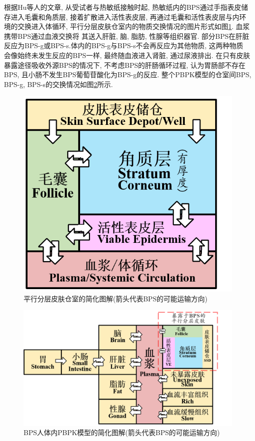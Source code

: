 \documentclass[a4paper,punct=banjiao,twoside]{ctexrep}
\theoremstyle{plain}
\theoremstyle{definition}
\theoremstyle{remark}
\begin{document}
根据Hu等人的文章\cite{11}, 从受试者与热敏纸接触时起, 热敏纸内的BPS通过手指表皮储存进入毛囊和角质层, 接着扩散进入活性表皮层, 再通过毛囊和活性表皮层与内环境的交换进入体循环, 平行分层皮肤仓室内的物质交换情况的图片形式如图\ref{分层皮肤}. 血浆携带BPS通过血液交换将
其送入肝脏, 脑, 脂肪, 性腺等组织器官. 部分BPS在肝脏反应为BPS-g或BPS-s.体内的BPS-g与BPS-s不会再反应为其他物质, 这两种物质
会像始终未发生反应的BPS一样, 最终随血液进入肾脏, 通过尿液排出. 在只有皮肤暴露途径吸收外源BPS的情况下, 不考虑BPS的肝肠循环过程, 认为胃肠部不存在BPS, 且小肠不发生BPS葡萄苷酸化为BPS-g的反应. 
整个PBPK模型的仓室间BPS, BPS-g, BPS-s的交换情况如图\ref{模型图解}所示.
\begin{figure}[H]
  \centering
  \includegraphics[scale=0.6]{./figs/p1.png}
  \caption{平行分层皮肤仓室的简化图解(箭头代表BPS的可能运输方向)}
  \label{分层皮肤}
\end{figure}

\begin{figure}[H]
  \centering
  \includegraphics[scale=0.6]{./figs/p2.png}
  \caption{BPS人体内PBPK模型的简化图解(箭头代表BPS的可能运输方向)}
  \label{模型图解}
\end{figure}
\end{document}
